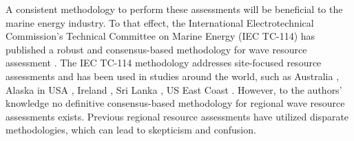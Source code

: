 A consistent methodology to perform these assessments will be beneficial to the marine energy industry. To that effect, the International Electrotechnical Commission's Technical Committee on Marine Energy (IEC TC-114) has published a robust and consensus-based methodology for \DIFdelbegin {}\DIFdelend wave resource assessment \citep[][hereafter, 62600-101]{internationalelectrotechnicalcommissionPart101Wave2015}. The IEC TC-114 methodology addresses site-focused resource assessments and has been used in studies around the world, such as Australia \citep{hemerRevisedAssessmentAustralia2017}, Alaska in USA \citep{garciamedinaWaveResourceCharacterization2021}, Ireland \citep{ramosExploringUtilityEffectiveness2016}, Sri Lanka \citep{lokuliyanaSriLankanWave2020}, US East Coast \citep{ahnNearshoreWaveEnergy2021}. However, to the authors’ knowledge no definitive consensus-based methodology for regional wave resource assessments exists. Previous regional resource assessments have utilized disparate methodologies, which can lead to skepticism and confusion. 

